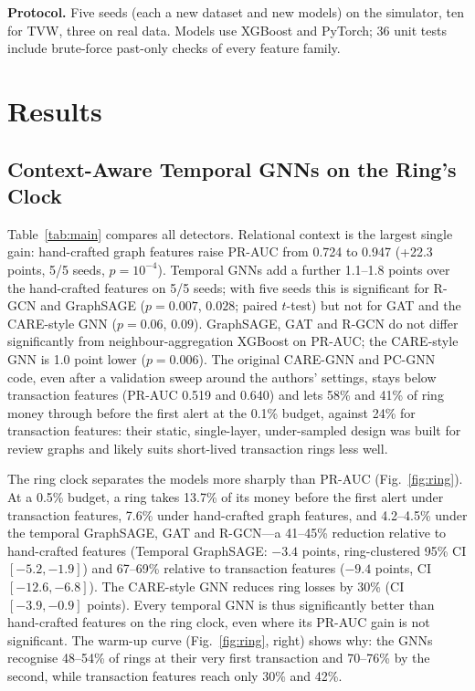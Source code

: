 \documentclass[10pt,letterpaper]{article}
\renewcommand{\footnotesize}{\fontsize{9pt}{11pt}\selectfont}
\begin{document}
\textbf{Protocol.} Five seeds (each a new dataset and new models) on the simulator, ten for TVW, three on real data. Models use XGBoost and PyTorch; 36 unit tests include brute-force past-only checks of every feature family.

\section{Results}
\subsection{Context-Aware Temporal GNNs on the Ring's Clock}\label{sec:res-main}

\begin{table}[!htbp]
\centering
\caption{Hard preset, 5 seeds. Row level: test PR-AUC (mean $\pm$ s.d.) and recall at 1\% FPR. Ring level: share of ring money lost before the first alert at 0.1\% and 0.5\% validation-FPR alert budgets (170 test rings), and recall on a ring's first transaction (0.5\% budget). Best in bold.}\label{tab:main}
\footnotesize

\end{table}

Table~\ref{tab:main} compares all detectors. Relational context is the largest single gain: hand-crafted graph features raise PR-AUC from 0.724 to 0.947 (+22.3 points, 5/5 seeds, $p=10^{-4}$). Temporal GNNs add a further 1.1--1.8 points over the hand-crafted features on 5/5 seeds; with five seeds this is significant for R-GCN and GraphSAGE ($p=0.007$, $0.028$; paired $t$-test) but not for GAT and the CARE-style GNN ($p=0.06$, $0.09$). GraphSAGE, GAT and R-GCN do not differ significantly from neighbour-aggregation XGBoost on PR-AUC; the CARE-style GNN is 1.0 point lower ($p=0.006$). The original CARE-GNN and PC-GNN code, even after a validation sweep around the authors' settings, stays below transaction features (PR-AUC 0.519 and 0.640) and lets 58\% and 41\% of ring money through before the first alert at the 0.1\% budget, against 24\% for transaction features: their static, single-layer, under-sampled design was built for review graphs and likely suits short-lived transaction rings less well.

The ring clock separates the models more sharply than PR-AUC (Fig.~\ref{fig:ring}). At a 0.5\% budget, a ring takes 13.7\% of its money before the first alert under transaction features, 7.6\% under hand-crafted graph features, and 4.2--4.5\% under the temporal GraphSAGE, GAT and R-GCN---a 41--45\% reduction relative to hand-crafted features (Temporal GraphSAGE: $-3.4$ points, ring-clustered 95\% CI $[-5.2,-1.9]$) and 67--69\% relative to transaction features ($-9.4$ points, CI $[-12.6,-6.8]$). The CARE-style GNN reduces ring losses by 30\% (CI $[-3.9,-0.9]$ points). Every temporal GNN is thus significantly better than hand-crafted features on the ring clock, even where its PR-AUC gain is not significant. The warm-up curve (Fig.~\ref{fig:ring}, right) shows why: the GNNs recognise 48--54\% of rings at their very first transaction and 70--76\% by the second, while transaction features reach only 30\% and 42\%.
\end{document}
